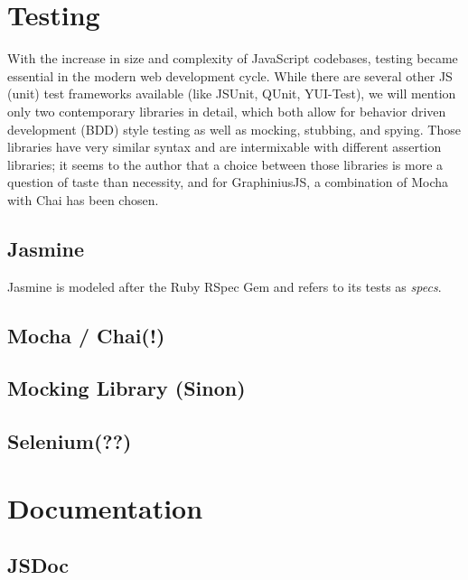 	
\section{Testing}
\label{sect:testing}

	With the increase in size and complexity of JavaScript codebases, testing became essential in the modern web development cycle. While there are several other JS (unit) test frameworks available (like JSUnit, QUnit, YUI-Test), we will mention only two contemporary libraries in detail, which both allow for behavior driven development (BDD) style testing as well as mocking, stubbing, and spying. Those libraries have very similar syntax and are intermixable with different assertion libraries; it seems to the author that a choice between those libraries is more a question of taste than necessity, and for GraphiniusJS, a combination of Mocha with Chai has been chosen.

	\subsection{Jasmine}
	\label{ssect:jasmine}
	
	Jasmine \citep{hahn2013javascript} is modeled after the Ruby RSpec Gem and refers to its tests as \textit{specs}.
	
	
	\subsection{Mocha / Chai(!)}
	\label{ssect:mocha_chai}
	
	\subsection{Mocking Library (Sinon)}
	\label{ssect:mocking}

	\subsection{Selenium(??)}
	\label{ssect:selenium}
	

\section{Documentation}
	\label{sect:documentation}
	
	\subsection{JSDoc}
	\label{ssect:jsdoc}
	
